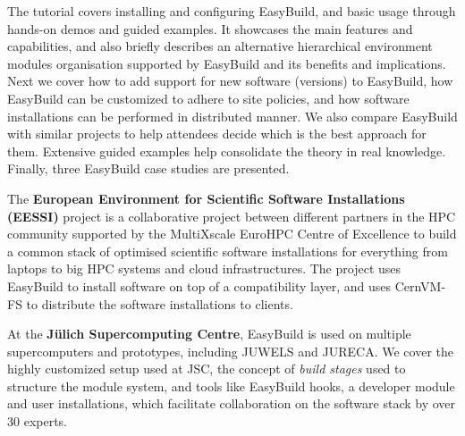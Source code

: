 The tutorial covers installing and configuring EasyBuild, and basic usage through hands-on demos and guided examples. It showcases the main features and capabilities, and also briefly describes an alternative hierarchical environment modules organisation supported by EasyBuild and its benefits and implications.
Next we cover how to add support for new software (versions) to EasyBuild, how EasyBuild can be customized to adhere to site policies, and how software installations can be performed in distributed manner.
We also compare EasyBuild with similar projects to help attendees decide which is the best approach for them.
Extensive guided examples help consolidate the theory in real knowledge.
Finally, three EasyBuild case studies are presented.

The \textbf{European Environment for Scientific Software Installations (EESSI)} project is a collaborative project between different partners in the HPC community supported by the MultiXscale EuroHPC Centre of Excellence to build a common stack of optimised scientific software installations for everything from laptops to big HPC systems and cloud infrastructures. The project uses EasyBuild to install software on top of a compatibility layer, and uses CernVM-FS to distribute the software installations to clients.

At the \textbf{J\"ulich Supercomputing Centre}, EasyBuild is used on multiple supercomputers and prototypes, including JUWELS and JURECA. We cover the highly customized setup used at JSC, the concept of \emph{build stages} used to structure the module
system, and tools like EasyBuild hooks, a developer module and user installations, which facilitate collaboration on the software stack by over 30 experts.

